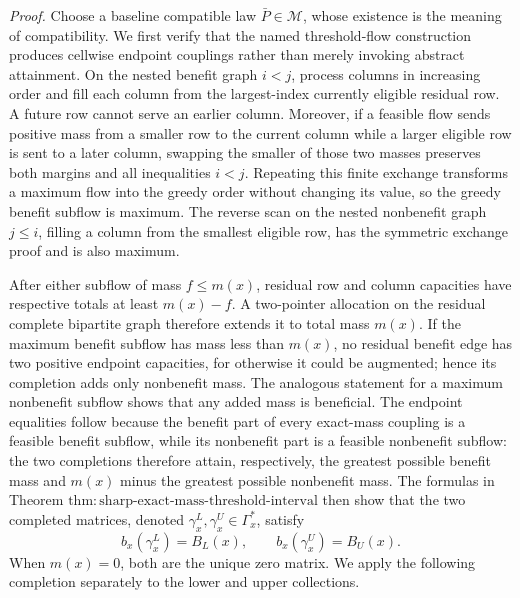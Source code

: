 \noindent\textit{Proof.}
Choose a baseline compatible law \(\bar P\in\mathcal M\), whose existence
is the meaning of compatibility.  We first verify that the named
threshold-flow construction produces cellwise endpoint couplings rather
than merely invoking abstract attainment.  On the nested benefit graph
\(i<j\), process columns in increasing order and fill each column from
the largest-index currently eligible residual row.  A future row cannot
serve an earlier column.  Moreover, if a feasible flow sends positive
mass from a smaller row to the current column while a larger eligible row
is sent to a later column, swapping the smaller of those two masses
preserves both margins and all inequalities \(i<j\).  Repeating this
finite exchange transforms a maximum flow into the greedy order without
changing its value, so the greedy benefit subflow is maximum.  The
reverse scan on the nested nonbenefit graph \(j\le i\), filling a column
from the smallest eligible row, has the symmetric exchange proof and is
also maximum.

After either subflow of mass \(f\le m(x)\), residual row and column
capacities have respective totals at least \(m(x)-f\).  A two-pointer
allocation on the residual complete bipartite graph therefore extends it
to total mass \(m(x)\).  If the maximum benefit subflow has mass less than
\(m(x)\), no residual benefit edge has two positive endpoint capacities,
for otherwise it could be augmented; hence its completion adds only
nonbenefit mass.  The analogous statement for a maximum nonbenefit
subflow shows that any added mass is beneficial.  The endpoint equalities
follow because the benefit part of every exact-mass coupling is a feasible
benefit subflow, while its nonbenefit part is a feasible nonbenefit
subflow: the two completions therefore attain, respectively, the greatest
possible benefit mass and \(m(x)\) minus the greatest possible nonbenefit
mass.  The formulas in Theorem
\(\mathrm{thm{:}sharp\text{-}exact\text{-}mass\text{-}threshold\text{-}interval}\)
then show that the two completed matrices, denoted
\(\gamma_x^L,\gamma_x^U\in\Gamma_x^{\ast}\), satisfy
\[
b_x(\gamma_x^L)=B_L(x),\qquad
b_x(\gamma_x^U)=B_U(x).
\tag{1}
\]
When \(m(x)=0\), both are the unique zero matrix.  We apply the following
completion separately to the lower and upper collections.

